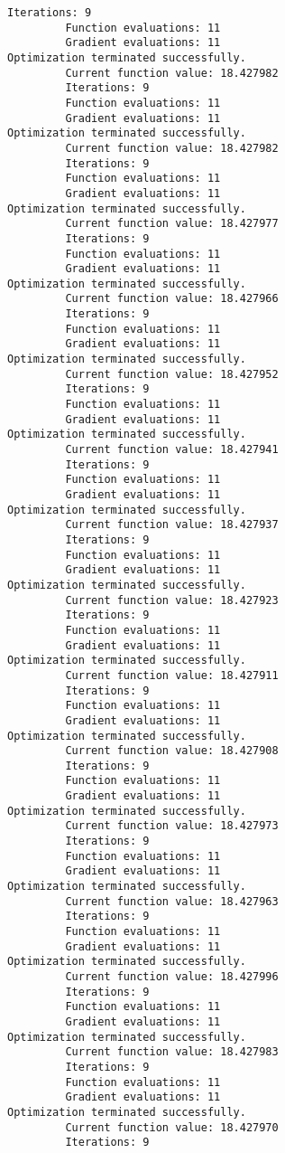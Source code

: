 \documentclass[11pt]{article}
\begin{document}
\begin{Verbatim}[commandchars=\\\{\}]
         Iterations: 9
         Function evaluations: 11
         Gradient evaluations: 11
Optimization terminated successfully.
         Current function value: 18.427982
         Iterations: 9
         Function evaluations: 11
         Gradient evaluations: 11
Optimization terminated successfully.
         Current function value: 18.427982
         Iterations: 9
         Function evaluations: 11
         Gradient evaluations: 11
Optimization terminated successfully.
         Current function value: 18.427977
         Iterations: 9
         Function evaluations: 11
         Gradient evaluations: 11
Optimization terminated successfully.
         Current function value: 18.427966
         Iterations: 9
         Function evaluations: 11
         Gradient evaluations: 11
Optimization terminated successfully.
         Current function value: 18.427952
         Iterations: 9
         Function evaluations: 11
         Gradient evaluations: 11
Optimization terminated successfully.
         Current function value: 18.427941
         Iterations: 9
         Function evaluations: 11
         Gradient evaluations: 11
Optimization terminated successfully.
         Current function value: 18.427937
         Iterations: 9
         Function evaluations: 11
         Gradient evaluations: 11
Optimization terminated successfully.
         Current function value: 18.427923
         Iterations: 9
         Function evaluations: 11
         Gradient evaluations: 11
Optimization terminated successfully.
         Current function value: 18.427911
         Iterations: 9
         Function evaluations: 11
         Gradient evaluations: 11
Optimization terminated successfully.
         Current function value: 18.427908
         Iterations: 9
         Function evaluations: 11
         Gradient evaluations: 11
Optimization terminated successfully.
         Current function value: 18.427973
         Iterations: 9
         Function evaluations: 11
         Gradient evaluations: 11
Optimization terminated successfully.
         Current function value: 18.427963
         Iterations: 9
         Function evaluations: 11
         Gradient evaluations: 11
Optimization terminated successfully.
         Current function value: 18.427996
         Iterations: 9
         Function evaluations: 11
         Gradient evaluations: 11
Optimization terminated successfully.
         Current function value: 18.427983
         Iterations: 9
         Function evaluations: 11
         Gradient evaluations: 11
Optimization terminated successfully.
         Current function value: 18.427970
         Iterations: 9

\end{Verbatim}
\end{document}
